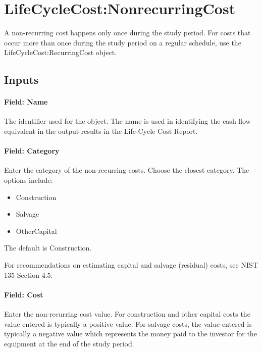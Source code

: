 \section{LifeCycleCost:NonrecurringCost}\label{lifecyclecostnonrecurringcost}

A non-recurring cost happens only once during the study period. For costs that occur more than once during the study period on a regular schedule, use the LifeCycleCost:RecurringCost object.

\subsection{Inputs}\label{inputs-057}

\paragraph{Field: Name}\label{field-name-055}

The identifier used for the object. The name is used in identifying the cash flow equivalent in the output results in the Life-Cycle Cost Report.

\paragraph{Field: Category}\label{field-category}

Enter the category of the non-recurring costs. Choose the closest category. The options include:

\begin{itemize}
\item
  Construction
\item
  Salvage
\item
  OtherCapital
\end{itemize}

The default is Construction.

For recommendations on estimating capital and salvage (residual) costs, see NIST 135 Section 4.5.

\paragraph{Field: Cost}\label{field-cost}

Enter the non-recurring cost value. For construction and other capital costs the value entered is typically a positive value. For salvage costs, the value entered is typically a negative value which represents the money paid to the investor for the equipment at the end of the study period.

